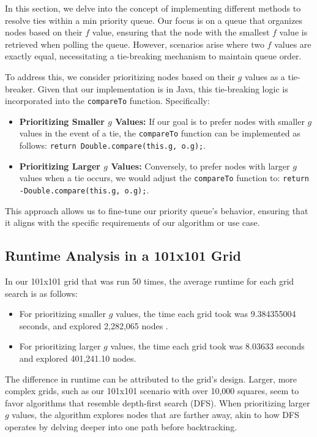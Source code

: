 \documentclass{article}
\begin{document}
In this section, we delve into the concept of implementing different methods to resolve ties within a min priority queue. Our focus is on a queue that organizes nodes based on their $f$ value, ensuring that the node with the smallest $f$ value is retrieved when polling the queue. However, scenarios arise where two $f$ values are exactly equal, necessitating a tie-breaking mechanism to maintain queue order.

To address this, we consider prioritizing nodes based on their $g$ values as a tie-breaker. Given that our implementation is in Java, this tie-breaking logic is incorporated into the \texttt{compareTo} function. Specifically:

\begin{itemize}
    \item \textbf{Prioritizing Smaller $g$ Values:} If our goal is to prefer nodes with smaller $g$ values in the event of a tie, the \texttt{compareTo} function can be implemented as follows: \texttt{return Double.compare(this.g, o.g);}.
    \item \textbf{Prioritizing Larger $g$ Values:} Conversely, to prefer nodes with larger $g$ values when a tie occurs, we would adjust the \texttt{compareTo} function to: \texttt{return -Double.compare(this.g, o.g);}.
\end{itemize}

This approach allows us to fine-tune our priority queue's behavior, ensuring that it aligns with the specific requirements of our algorithm or use case.

\subsection{Runtime Analysis in a 101x101 Grid}
In our 101x101 grid that was run 50 times, the average runtime for each grid search is as follows:
\begin{itemize}
    \item For prioritizing smaller $g$ values, the time each grid took was 9.384355004 seconds, and explored 2,282,065 nodes .
    \item For prioritizing larger $g$ values, the time each grid took was 8.03633 seconds and explored 401,241.10 nodes.
\end{itemize}

The difference in runtime can be attributed to the grid's design. Larger, more complex grids, such as our 101x101 scenario with over 10,000 squares, seem to favor algorithms that resemble depth-first search (DFS). When prioritizing larger $g$ values, the algorithm explores nodes that are farther away, akin to how DFS operates by delving deeper into one path before backtracking.
\end{document}
